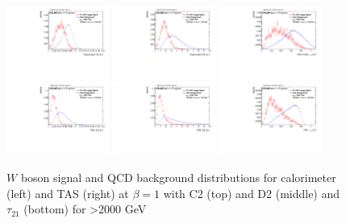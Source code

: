 \begin{figure}[htp]
\includegraphics[width=0.3\textwidth]{sascha_input/plots/W/Beta1/h_recoJet_C2_bin6.pdf} 
\includegraphics[width=0.3\textwidth]{sascha_input/plots/W/Beta1/h_recoJet_D2_bin6.pdf} 	
\includegraphics[width=0.3\textwidth]{sascha_input/plots/W/Beta1/h_recoJet_nSub21_bin6.pdf}
\bigskip
\includegraphics[width=0.3\textwidth]{sascha_input/plots/W/Beta1/h_assisted_tj_C2_bin6.pdf} \hspace{6mm}
\includegraphics[width=0.3\textwidth]{sascha_input/plots/W/Beta1/h_assisted_tj_D2_bin6.pdf} \hspace{6mm}
\includegraphics[width=0.3\textwidth]{sascha_input/plots/W/Beta1/h_assisted_tj_nSub21_bin6.pdf}
\caption{{$W$ boson signal and QCD background distributions for calorimeter (left) and TAS (right) at $\beta=1$  with C2 (top) and D2 (middle) and $\tau_{21}$ (bottom) for >2000 GeV}}\label{fig:w_distribution_example}
\end{figure}

